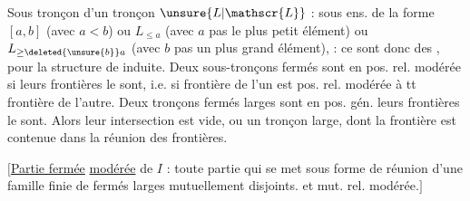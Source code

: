 Sous tronçon  d'un tronçon $\unsure{L|\mathscr{L}}$ : sous ens. de la forme $[a,b]$ (avec $a<b$) ou $L_{\leq a}$ (avec $a$ pas le plus petit élément) ou $L_{\geq\deleted{\unsure{b}}a}$ (avec $b$ pas un plus grand élément),  : ce sont donc des , pour la structure de  induite.
 Deux sous-tronçons fermés sont  en pos. rel. modérée si leurs frontières le sont, i.e. si    frontière de l'un est  pos. rel. modérée à tt  frontière de l'autre.
  Deux tronçons fermés larges sont en pos. gén.  leurs frontières  le sont.
Alors leur intersection est vide,  ou un  tronçon large, dont la frontière est contenue dans  la réunion des frontières.

$\bigl[$\uline{Partie fermée} \uline{modérée} de $I$ : toute partie qui se met sous forme de réunion d'une famille finie de  fermés larges mutuellement disjoints. et mut.  rel. modérée.$\bigr]$

